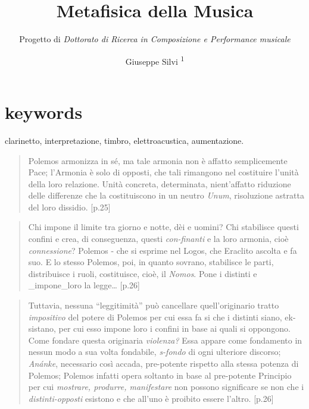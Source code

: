 \documentclass{gs-adonis}
\title{Metafisica della Musica}
\subtitle{Progetto di \emph{Dottorato di Ricerca in Composizione e Performance musicale}}
\author{Giuseppe Silvi \textsuperscript{1}}
\begin{document}
\maketitle
\section*{keywords}
clarinetto, interpretazione, timbro, elettroacustica, aumentazione.

\begin{quote}
Polemos armonizza in sé, ma tale armonia non è affatto semplicemente
Pace; l'Armonia è solo di opposti, che tali rimangono nel costituire
l'unità della loro relazione. Unità concreta, determinata, nient'affatto
riduzione delle differenze che la costituiscono in un neutro
\emph{Unum}, risoluzione astratta del loro dissidio. {[}p.25{]}
\end{quote}

\begin{quote}
Chi impone il limite tra giorno e notte, dèi e uomini? Chi stabilisce
questi confini e crea, di conseguenza, questi \emph{con-finanti} e la
loro armonia, cioè \emph{connessione}? Polemos - che si esprime nel
Logos, che Eraclito ascolta e fa suo. E lo stesso Polemos, poi, in
quanto sovrano, stabilisce le parti, distribuisce i ruoli, costituisce,
cioè, il \emph{Nomos}. Pone i distinti e \_impone\_loro la legge\ldots{}
{[}p.26{]}
\end{quote}

\begin{quote}
Tuttavia, nessuna ``leggitimità'' può cancellare quell'originario tratto
\emph{impositivo} del potere di Polemos per cui essa fa si che i
distinti siano, ek-sistano, per cui esso impone loro i confini in base
ai quali si oppongono. Come fondare questa originaria \emph{violenza?}
Essa appare come fondamento in nessun modo a sua volta fondabile,
\emph{s-fondo} di ogni ulteriore discorso; \emph{Anánke}, necessario
così accada, pre-potente rispetto alla stessa potenza di Polemos;
Polemos infatti opera soltanto in base al pre-potente Principio per cui
\emph{mostrare, produrre, manifestare} non possono significare se non
che i \emph{distinti-opposti} esistono e che all'uno è proibito essere
l'altro. {[}p.26{]}
\end{quote}
\end{document}
